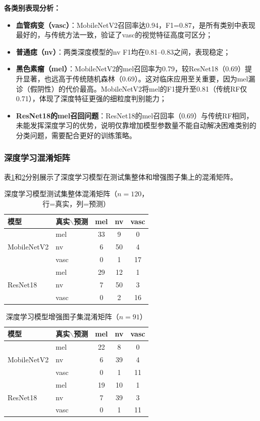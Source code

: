 \documentclass[UTF8,a4paper,12pt]{ctexart}
\numberwithin{figure}{section}
\numberwithin{table}{section}
\begin{document}
\textbf{各类别表现分析：}
\begin{itemize}
    \item \textbf{血管病变（vasc）}：MobileNetV2召回率达0.94，F1=0.87，是所有类别中表现最好的，与传统方法一致，验证了vasc的视觉特征高度可区分；
    \item \textbf{普通痣（nv）}：两类深度模型的nv F1均在0.81--0.83之间，表现稳定；
    \item \textbf{黑色素瘤（mel）}：MobileNetV2的mel召回率为0.79，较ResNet18（0.69）提升显著，也远高于传统随机森林（0.69）。这对临床应用至关重要，因为mel漏诊（假阴性）的代价最高。MobileNetV2将mel的F1提升至0.81（传统RF仅0.71），体现了深度特征更强的细粒度判别能力；
    \item \textbf{ResNet18的mel召回问题}：ResNet18的mel召回率（0.69）与传统RF相同，未能发挥深度学习的优势，说明仅靠增加模型参数量不能自动解决困难类别的分类问题，需要配合更好的训练策略。
\end{itemize}

\subsubsection{深度学习混淆矩阵}

表\ref{tab:cm_dl}和\ref{tab:cm_dl_aug}分别展示了深度学习模型在测试集整体和增强图子集上的混淆矩阵。

\begin{table}[H]
\centering
\caption{深度学习模型测试集整体混淆矩阵（$n=120$，行=真实，列=预测）}
\label{tab:cm_dl}
\begin{tabular}{ll|ccc}
\toprule
\textbf{模型} & \textbf{真实$\backslash$预测} & \textbf{mel} & \textbf{nv} & \textbf{vasc} \\
\midrule
\multirow{3}{*}{MobileNetV2}
& mel  & 33 & 9  & 0 \\
& nv   & 6  & 50 & 4 \\
& vasc & 0  & 1  & 17 \\
\midrule
\multirow{3}{*}{ResNet18}
& mel  & 29 & 12 & 1 \\
& nv   & 7  & 50 & 3 \\
& vasc & 0  & 2  & 16 \\
\bottomrule
\end{tabular}
\end{table}

\begin{table}[H]
\centering
\caption{深度学习模型增强图子集混淆矩阵（$n=91$）}
\label{tab:cm_dl_aug}
\begin{tabular}{ll|ccc}
\toprule
\textbf{模型} & \textbf{真实$\backslash$预测} & \textbf{mel} & \textbf{nv} & \textbf{vasc} \\
\midrule
\multirow{3}{*}{MobileNetV2}
& mel  & 22 & 8  & 0 \\
& nv   & 6  & 39 & 4 \\
& vasc & 0  & 1  & 11 \\
\midrule
\multirow{3}{*}{ResNet18}
& mel  & 19 & 10 & 1 \\
& nv   & 7  & 39 & 3 \\
& vasc & 0  & 1  & 11 \\
\bottomrule
\end{tabular}
\end{table}
\end{document}
